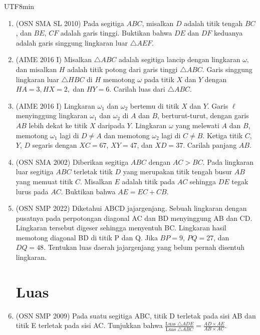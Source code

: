 \documentclass[12pt]{scrartcl}
\begin{document}
\begin{CJK*}{UTF8}{min}
\begin{enumerate}
    \item (OSN SMA SL 2010) Pada segitiga $ABC$, misalkan $D$ adalah titik tengah $BC$, dan $BE$, $CF$ adalah garis tinggi. Buktikan bahwa $DE$ dan $DF$ keduanya adalah garis singgung lingkaran luar $\triangle AEF$. %

    \item (AIME 2016 I) Misalkan $\triangle ABC$ adalah segitiga lancip dengan lingkaran $\omega,$ dan misalkan $H$ adalah titik potong dari garis tinggi $\triangle ABC.$ Garis singgung lingkaran luar $\triangle HBC$ di $H$ memotong $\omega$ pada titik $X$ dan $Y$ dengan $HA=3,HX=2,$ dan $HY=6.$ Carilah luas dari $\triangle ABC$.

    \item (AIME 2016 I) Lingkaran $\omega_1$ dan $\omega_2$ bertemu di titik $X$ dan $Y$. Garis $\ell$ menyinggung lingkaran $\omega_1$ dan $\omega_2$ di $A$ dan $B$, berturut-turut, dengan garis $AB$ lebih dekat ke titik $X$ daripada $Y$. Lingkaran $\omega$ yang melewati $A$ dan $B$, memotong $\omega_1$ lagi di $D \neq A$ dan memotong $\omega_2$ lagi di $C \neq B$. Ketiga titik $C$, $Y$, $D$ segaris dengan $XC = 67$, $XY = 47$, dan $XD = 37$. Carilah panjang $AB$.


    \item (OSN SMA 2002)
    Diberikan segitiga $ABC$ dengan $AC > BC$. Pada lingkaran luar segitiga $ABC$ terletak titik $D$ yang merupakan titik tengah busur $AB$ yang memuat titik $C$. Misalkan $E$ adalah titik pada $AC$ sehingga $DE$ tegak lurus pada $AC$. Buktikan bahwa $AE = EC + CB$.

    \item (OSN SMP 2022) Diketahui ABCD jajargenjang. Sebuah lingkaran dengan pusatnya pada perpotongan diagonal AC dan BD menyinggung AB dan CD. Lingkaran tersebut digeser sehingga menyentuh BC. Lingkaran hasil memotong diagonal BD di titik P dan Q. Jika $BP=9$, $PQ=27$, dan $DQ=48$. Tentukan luas daerah jajargenjang yang belum pernah disentuh lingkaran.

\section{Luas}
    \item (OSN SMP 2009) Pada suatu segitiga ABC, titik D terletak pada sisi AB dan titik E terletak pada sisi AC. Tunjukkan bahwa $\frac{\text{Luas } \triangle ADE}{\text{Luas } \triangle ABC} = \frac{AD \times AE}{AB \times AC}$.


\end{enumerate}
\end{CJK*}
\end{document}
